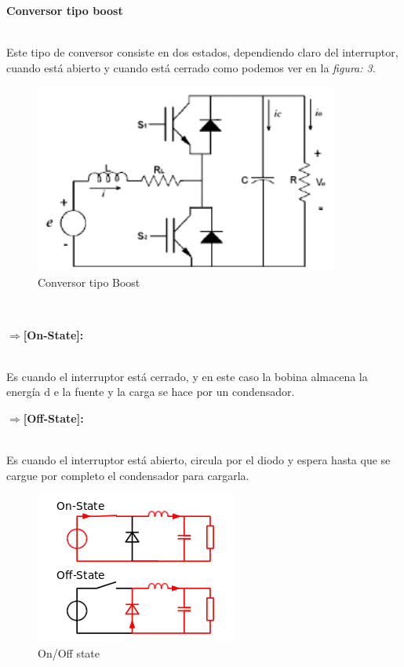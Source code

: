 \documentclass[a3paper,12pt]{article}
\begin{document}
{\begin{flushleft}
\begin{LARGE}
	\begin{huge}
	\textbf{Conversor tipo boost}
	\end{huge}\\
	Este tipo de conversor consiste en dos estados, dependiendo claro del interruptor, cuando está abierto y cuando está cerrado como podemos ver en la \textit{figura: 3}.
	 \begin{figure}[hbtp]
	 \centering
	 \includegraphics[width=10cm]{boost.png}
	 \caption{Conversor tipo Boost}
	 \end{figure}\\
	\hspace{3cm}\begin{huge}\textbf{$\Rightarrow$[On-State]:}	\end{huge}\\
		Es cuando el interruptor está cerrado, y en este caso la bobina almacena la energía d e la fuente y la carga se hace por un condensador.\\ 
		\vspace{1cm}
	\hspace{3cm}\begin{huge}\textbf{$\Rightarrow$[Off-State]:}	\end{huge}\\
	Es cuando el interruptor está abierto, circula por el diodo y espera hasta que se cargue por completo el condensador para cargarla. \\
	\begin{figure}[hbtp]
	\caption{On/Off state}
	\centering
	\includegraphics[scale=1]{on-offsstate.png}
	\end{figure}
	

\end{LARGE}
\end{flushleft}}
\end{document}
